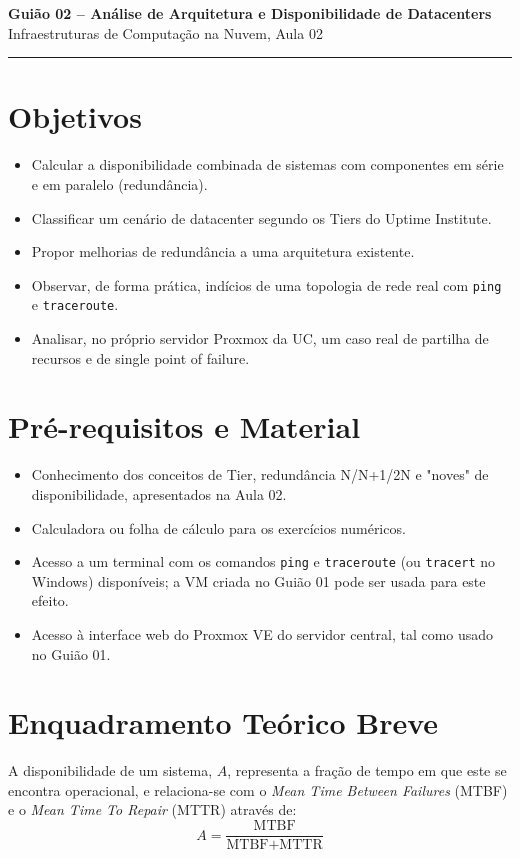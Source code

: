 \documentclass[11pt,a4paper]{article}
\newcommand{\guiaotitle}[2]{%
  \begin{center}
  {\Large\bfseries\color{TextEspresso} #1}\\[0.3cm]
  {\normalsize\color{NudeTaupe} #2}\\[0.2cm]
  {\color{NudeTaupe}\rule{4cm}{0.5pt}}
  \end{center}
  \vspace{0.5cm}
}
\begin{document}
\guiaotitle{Guião 02 -- Análise de Arquitetura e Disponibilidade de Datacenters}{Infraestruturas de Computação na Nuvem, Aula 02}

\section{Objetivos}
\begin{itemize}[itemsep=0.2cm]
  \item Calcular a disponibilidade combinada de sistemas com componentes em série e em paralelo (redundância).
  \item Classificar um cenário de datacenter segundo os Tiers do Uptime Institute.
  \item Propor melhorias de redundância a uma arquitetura existente.
  \item Observar, de forma prática, indícios de uma topologia de rede real com \texttt{ping} e \texttt{traceroute}.
  \item Analisar, no próprio servidor Proxmox da UC, um caso real de partilha de recursos e de single point of failure.
\end{itemize}

\section{Pré-requisitos e Material}
\begin{itemize}[itemsep=0.2cm]
  \item Conhecimento dos conceitos de Tier, redundância N/N+1/2N e "noves" de disponibilidade, apresentados na Aula 02.
  \item Calculadora ou folha de cálculo para os exercícios numéricos.
  \item Acesso a um terminal com os comandos \texttt{ping} e \texttt{traceroute} (ou \texttt{tracert} no Windows) disponíveis; a VM criada no Guião 01 pode ser usada para este efeito.
  \item Acesso à interface web do Proxmox VE do servidor central, tal como usado no Guião 01.
\end{itemize}

\section{Enquadramento Teórico Breve}
A disponibilidade de um sistema, $A$, representa a fração de tempo em que este se encontra operacional, e relaciona-se com o \emph{Mean Time Between Failures} (MTBF) e o \emph{Mean Time To Repair} (MTTR) através de:
\[
A = \frac{\text{MTBF}}{\text{MTBF} + \text{MTTR}}
\]
\end{document}
